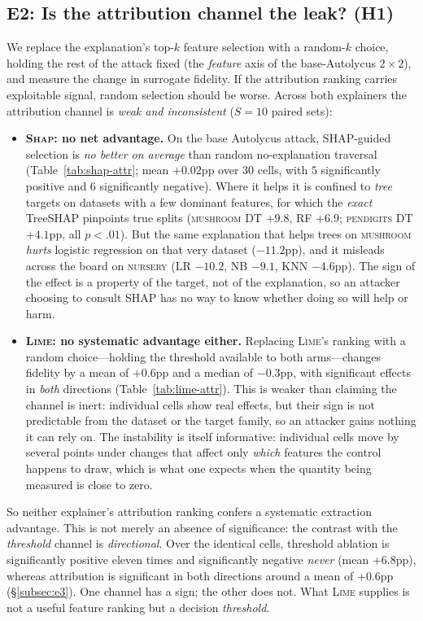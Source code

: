 \documentclass[sigconf,anonymous,review]{acmart}
\begin{document}
\subsection{E2: Is the attribution channel the leak? (H1)}
\label{subsec:e2}
We replace the explanation's top-$k$ feature selection with a random-$k$ choice, holding the rest of
the attack fixed (the \emph{feature} axis of the base-Autolycus $2{\times}2$), and measure the change
in surrogate fidelity. If the attribution ranking carries exploitable signal, random selection should
be worse. Across both explainers the attribution channel is \emph{weak and inconsistent} ($S{=}10$
paired sets):
\begin{itemize}
  \item \textbf{\textsc{Shap}: no net advantage.} On the base Autolycus attack, SHAP-guided selection
  is \emph{no better on average} than random no-explanation traversal (Table~\ref{tab:shap-attr}; mean
  $+0.02$pp over $30$ cells, with $5$ significantly positive and $6$ significantly negative). Where it
  helps it is confined to \emph{tree} targets on datasets with a few dominant features, for which the
  \emph{exact} TreeSHAP pinpoints true splits (\textsc{mushroom} DT $+9.8$, RF $+6.9$;
  \textsc{pendigits} DT $+4.1$pp, all $p{<}.01$). But the same explanation that helps trees on
  \textsc{mushroom} \emph{hurts} logistic regression on that very dataset ($-11.2$pp), and it misleads
  across the board on \textsc{nursery} (LR $-10.2$, NB $-9.1$, KNN $-4.6$pp). The sign of the effect is
  a property of the target, not of the explanation, so an attacker choosing to consult SHAP has no way
  to know whether doing so will help or harm.
  \item \textbf{\textsc{Lime}: no systematic advantage either.} Replacing \textsc{Lime}'s ranking with
  a random choice---holding the threshold available to both arms---changes fidelity by a mean of
  $+0.6$pp and a median of $-0.3$pp, with significant effects in \emph{both} directions
  (Table~\ref{tab:lime-attr}). This is weaker than claiming the channel is inert: individual cells
  show real effects, but their sign is not predictable from the dataset or the target family, so an
  attacker gains nothing it can rely on. The instability is itself informative: individual cells move
  by several points under changes that affect only \emph{which} features the control happens to draw,
  which is what one expects when the quantity being measured is close to zero.
\end{itemize}
So neither explainer's attribution ranking confers a systematic extraction advantage. This is not
merely an absence of significance: the contrast with the \emph{threshold} channel is \emph{directional}.
Over the identical cells, threshold ablation is significantly positive eleven times and significantly
negative \emph{never} (mean $+6.8$pp), whereas attribution is significant in both directions around a
mean of $+0.6$pp (\S\ref{subsec:e3}). One channel has a sign; the other does not.
What \textsc{Lime} supplies is not a useful feature ranking but a decision \emph{threshold}.
\end{document}
